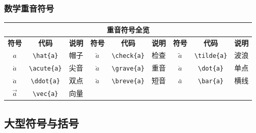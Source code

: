 \documentclass{article}
\begin{document}
\subsubsection{数学重音符号}
\begin{center}
    \footnotesize
    \begin{tabular}{ccc|ccc|ccc}
        \hline
        \multicolumn{9}{c}{\normalsize\textbf{重音符号全览}}                                                                                             \\
        \hline
        \textbf{符号} & \textbf{代码}      & \textbf{说明} & \textbf{符号} & \textbf{代码}      & \textbf{说明} & \textbf{符号} & \textbf{代码}      & \textbf{说明} \\
        \hline
        $\hat{a}$   & \verb|\hat{a}|   & 帽子          & $\check{a}$ & \verb|\check{a}| & 检查          & $\tilde{a}$ & \verb|\tilde{a}| & 波浪          \\
        $\acute{a}$ & \verb|\acute{a}| & 尖音          & $\grave{a}$ & \verb|\grave{a}| & 重音          & $\dot{a}$   & \verb|\dot{a}|   & 单点          \\
        $\ddot{a}$  & \verb|\ddot{a}|  & 双点          & $\breve{a}$ & \verb|\breve{a}| & 短音          & $\bar{a}$   & \verb|\bar{a}|   & 横线          \\
        $\vec{a}$   & \verb|\vec{a}|   & 向量          &             &                  &             &             &                  &             \\
        \hline
    \end{tabular}
\end{center}

\subsection{大型符号与括号}
\end{document}
